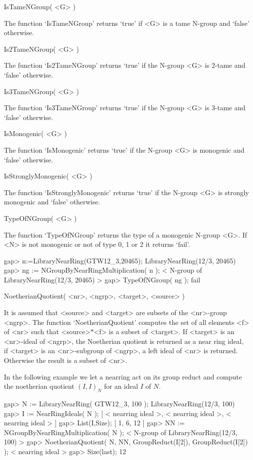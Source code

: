 \>IsTameNGroup( <G> )

The function `IsTameNGroup' returns `true' if <G> is a tame N-group
and `false' otherwise.

\>Is2TameNGroup( <G> )

The function `Is2TameNGroup' returns `true' if the N-group <G> is 2-tame
and `false' otherwise.

\>Is3TameNGroup( <G> )

The function `Is3TameNGroup' returns `true' if the N-group <G> is 3-tame
and `false' otherwise.

\>IsMonogenic( <G> )

The function `IsMonogenic' returns `true' if the N-group <G> is monogenic
and `false' otherwise.

\>IsStronglyMonogenic( <G> )

The function `IsStronglyMonogenic' returns `true' if the N-group <G> is
strongly monogenic and `false' otherwise.

\>TypeOfNGroup( <G> )

The function `TypeOfNGroup' returns the type of a monogenic N-group <G>. If
<N> is not monogenic or not of type 0, 1 or 2 it returns `fail'.

\beginexample
    gap> n:=LibraryNearRing(GTW12_3,20465);
    LibraryNearRing(12/3, 20465)
    gap> ng := NGroupByNearRingMultiplication( n );
    < N-group of LibraryNearRing(12/3, 20465) >
    gap> TypeOfNGroup( ng );
    fail
\endexample



\>NoetherianQuotient( <nr>, <ngrp>, <target>, <source> )

It is assumed that <source> and <target> are subsets of the <nr>-group
<ngrp>. The function `NoetherianQuotient' computes the set of all
elements <f> of <nr> such that <source>$*$<f> is a subset of <target>.
If <target> is an <nr>-ideal of <ngrp>, the Noetherian quotient is
returned as a near ring ideal, if <target> is an <nr>-subgroup of
<ngrp>, a left ideal of <nr> is returned. Otherwise the result is a
subset of <nr>.

In the following example we let a nearring act on its group reduct and
compute the noetherian quotient $(I,I)_N$ for an ideal $I$ of $N$.

\beginexample
    gap> N := LibraryNearRing( GTW12_3, 100 );
    LibraryNearRing(12/3, 100)
    gap> I := NearRingIdeals( N );            
    [ < nearring ideal >, < nearring ideal >, < nearring ideal > ]
    gap> List(I,Size);
    [ 1, 6, 12 ]
    gap> NN := NGroupByNearRingMultiplication( N );
    < N-group of LibraryNearRing(12/3, 100) >
    gap> NoetherianQuotient( N, NN, GroupReduct(I[2]), GroupReduct(I[2]) );
    < nearring ideal >
    gap> Size(last);
    12
\endexample

